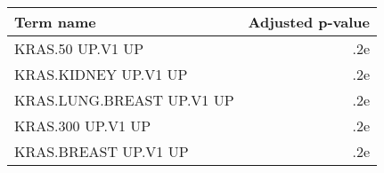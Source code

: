 \begin{tabular}{lr}
\toprule
                Term name &  Adjusted p-value \\
\midrule
         KRAS.50 UP.V1 UP &               .2e \\
     KRAS.KIDNEY UP.V1 UP &               .2e \\
KRAS.LUNG.BREAST UP.V1 UP &               .2e \\
        KRAS.300 UP.V1 UP &               .2e \\
     KRAS.BREAST UP.V1 UP &               .2e \\
\bottomrule
\end{tabular}
